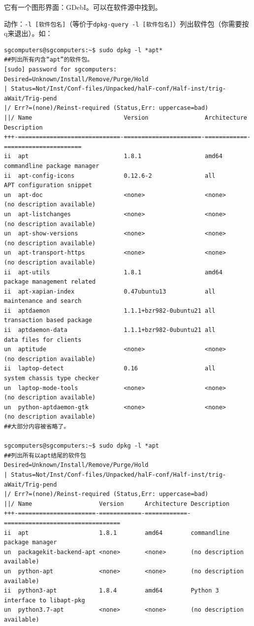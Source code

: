 它有一个图形界面：GDebI。可以在软件源中找到。\par
动作：\verb|-l [软件包名]|（等价于\verb|dpkg-query -l [软件包名]|）列出软件包（你需要按q来退出）。如：
\begin{verbatim}
sgcomputers@sgcomputers:~$ sudo dpkg -l *apt*
##列出所有内含“apt”的软件包。
[sudo] password for sgcomputers: 
Desired=Unknown/Install/Remove/Purge/Hold
| Status=Not/Inst/Conf-files/Unpacked/halF-conf/Half-inst/trig-aWait/Trig-pend
|/ Err?=(none)/Reinst-required (Status,Err: uppercase=bad)
||/ Name                          Version                Architecture Description
+++-=============================-======================-============-======================
ii  apt                           1.8.1                  amd64        commandline package manager
ii  apt-config-icons              0.12.6-2               all          APT configuration snippet 
un  apt-doc                       <none>                 <none>       (no description available)
un  apt-listchanges               <none>                 <none>       (no description available)
un  apt-show-versions             <none>                 <none>       (no description available)
un  apt-transport-https           <none>                 <none>       (no description available)
ii  apt-utils                     1.8.1                  amd64        package management related 
ii  apt-xapian-index              0.47ubuntu13           all          maintenance and search 
ii  aptdaemon                     1.1.1+bzr982-0ubuntu21 all          transaction based package 
ii  aptdaemon-data                1.1.1+bzr982-0ubuntu21 all          data files for clients
un  aptitude                      <none>                 <none>       (no description available)
ii  laptop-detect                 0.16                   all          system chassis type checker
un  laptop-mode-tools             <none>                 <none>       (no description available)
un  python-aptdaemon-gtk          <none>                 <none>       (no description available)
##大部分内容被省略了。

sgcomputers@sgcomputers:~$ sudo dpkg -l *apt
##列出所有以apt结尾的软件包
Desired=Unknown/Install/Remove/Purge/Hold
| Status=Not/Inst/Conf-files/Unpacked/halF-conf/Half-inst/trig-aWait/Trig-pend
|/ Err?=(none)/Reinst-required (Status,Err: uppercase=bad)
||/ Name                   Version      Architecture Description
+++-======================-============-============-=================================
ii  apt                    1.8.1        amd64        commandline package manager
un  packagekit-backend-apt <none>       <none>       (no description available)
un  python-apt             <none>       <none>       (no description available)
ii  python3-apt            1.8.4        amd64        Python 3 interface to libapt-pkg
un  python3.7-apt          <none>       <none>       (no description available)


\end{verbatim}
